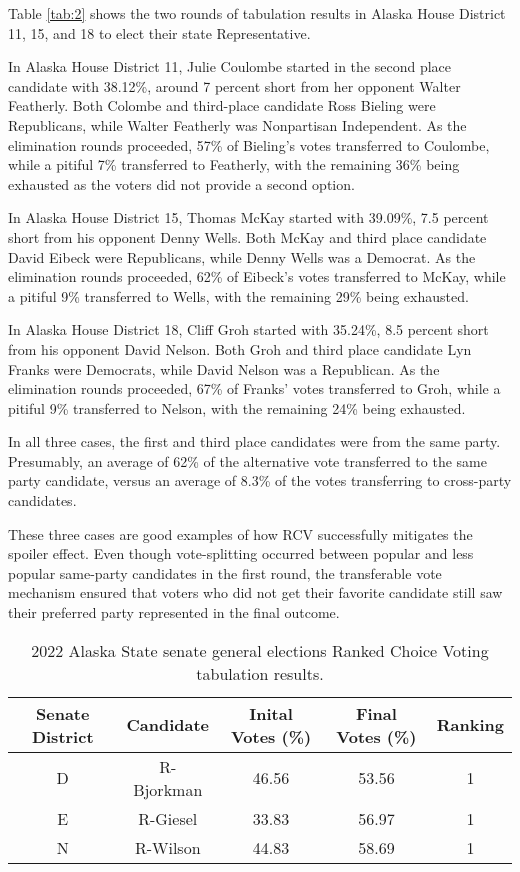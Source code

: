 \documentclass[12pt, a4paper, twoside]{article}
\begin{document}
Table \ref{tab:2} shows the two rounds of tabulation results in Alaska House District 11, 15, and 18 to elect their state Representative. 

In Alaska House District 11, Julie Coulombe started in the second place candidate with 38.12\%, around 7 percent short from her opponent Walter Featherly. Both Colombe and third-place candidate Ross Bieling were Republicans, while Walter Featherly was Nonpartisan Independent. As the elimination rounds proceeded, 57\% of Bieling’s votes transferred to Coulombe, while a pitiful 7\% transferred to Featherly, with the remaining 36\% being exhausted as the voters did not provide a second option. 

In Alaska House District 15, Thomas McKay started with 39.09\%, 7.5 percent short from his opponent Denny Wells. Both McKay and third place candidate David Eibeck were Republicans, while Denny Wells was a Democrat. As the elimination rounds proceeded, 62\% of Eibeck’s votes transferred to McKay, while a pitiful 9\% transferred to Wells, with the remaining 29\% being exhausted.

In Alaska House District 18, Cliff Groh started with 35.24\%, 8.5 percent short from his opponent David Nelson. Both Groh and third place candidate Lyn Franks were Democrats, while David Nelson was a Republican. As the elimination rounds proceeded, 67\% of Franks’ votes transferred to Groh, while a pitiful 9\% transferred to Nelson, with the remaining 24\% being exhausted. 

In all three cases, the first and third place candidates were from the same party. Presumably, an average of 62\% of the alternative vote transferred to the same party candidate, versus an average of 8.3\% of the votes transferring to cross-party candidates. 

These three cases are good examples of how RCV successfully mitigates the spoiler effect. Even though vote-splitting occurred between popular and less popular same-party candidates in the first round, the transferable vote mechanism ensured that voters who did not get their favorite candidate still saw their preferred party represented in the final outcome. 

\begin{table}
\centering
\begin{tabular}{|c|c|c|c|c|}
\hline
Senate District & Candidate & Inital Votes (\%) & Final Votes (\%) & Ranking \\ \hline
D & R-Bjorkman & 46.56 & 53.56 & 1 \\ \hline
E & R-Giesel & 33.83 & 56.97 & 1 \\ \hline
N & R-Wilson & 44.83 & 58.69 & 1 \\ \hline
\end{tabular}
\caption{2022 Alaska State senate general elections Ranked Choice Voting tabulation results.}
\label{tab:3}
\end{table}
\end{document}

